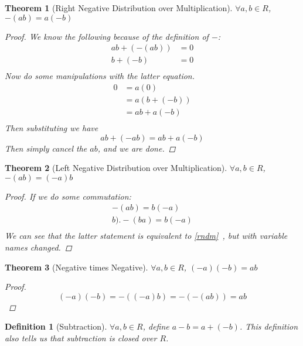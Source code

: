 \documentclass{article}
\newtheorem{thm}{Theorem}
\newtheorem*{defun}{Definition}
\begin{document}
  \begin{thm} [Right Negative Distribution over Multiplication]\label{rndm} $\forall a, b \in R$, $-(ab) = a(-b)$
    \begin{proof}
      We know the following because of the definition of $-$:
      \begin{align*}
        ab + (-(ab)) &= 0\\
        b + (-b) &= 0\\
      \end{align*}
      Now do some manipulations with the latter equation.
      \begin{align*}
        0 &= a(0) \\
          &= a(b + (-b))\\
          &= ab + a(-b)\\
      \end{align*}
      Then substituting we have
      \begin{equation*}
        ab + (-ab) = ab + a(-b)
      \end{equation*}
      Then simply cancel the $ab$, and we are done.
    \end{proof}
  \end{thm}
  \begin{thm} [Left Negative Distribution over Multiplication] $\forall a, b \in R$, $-(ab) = (-a)b$
    \begin{proof}
      If we do some commutation:
      \begin{align*}
        -(ab) = b(-a)\\b).
        -(ba) = b(-a)\\
      \end{align*}
      We can see that the latter statement is equivalent to \eqref{rndm}\ , but with variable names changed.
    \end{proof}
  \end{thm}
  \begin{thm} [Negative times Negative]\label{negtneg} $\forall a, b \in R$, $(-a)(-b) = ab$
    \begin{proof}
      \begin{equation*}
        (-a)(-b) = -((-a)b) = -(-(ab)) = ab 
      \end{equation*}
    \end{proof}
  \end{thm}
  \begin{defun} [Subtraction] $\forall a, b \in R$, define $a - b = a + (-b)$. This definition also tells us that subtraction is closed over $R$.
  \end{defun}
\end{document}

